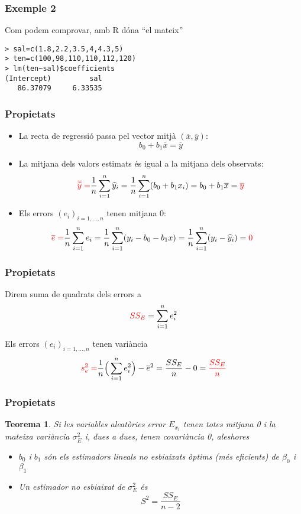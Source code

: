 \documentclass[12pt,t]{beamer}
\newcommand{\red}[1]{\textcolor{red}{#1}}
\renewcommand{\emph}[1]{{\color{red}#1}}
\theoremstyle{plain}
\newtheorem{teorema}{Teorema}
\theoremstyle{definition}
\begin{document}
\begin{frame}[fragile]
\frametitle{Exemple 2}
Com podem comprovar, amb R dóna ``el mateix''
\begin{verbatim}
> sal=c(1.8,2.2,3.5,4,4.3,5)
> ten=c(100,98,110,110,112,120)
> lm(ten~sal)$coefficients
(Intercept)         sal 
   86.37079     6.33535 
\end{verbatim}
\end{frame}



\begin{frame}
\frametitle{Propietats}

\begin{itemize}
\item La recta de regressió passa pel vector mitjà
$(\overline{x},\overline{y})$:
$$
b_0+b_1 \overline{x}=\overline{y}
$$

\item La mitjana dels valors estimats és igual a la mitjana dels
observats:
$$
\red{\overline{\widehat{y}}=}\frac{1}{n}\sum_{i=1}^n\widehat{y}_i
=\frac{1}{n}\sum_{i=1}^n(b_0+b_1x_i)=
b_0+b_1 \overline{x}=\red{\overline{y}}
$$

\item Els errors $(e_i)_{i=1,\ldots,n}$ tenen mitjana 0:
$$
\hspace*{-0.7cm}\red{\overline{e}
=}\frac{1}{n}\sum_{i=1}^n e_i
=\frac{1}{n}\sum_{i=1}^n (y_i-b_0-b_1x)
=\frac{1}{n}\sum_{i=1}^n (y_i-\widehat{y}_i)
=\red{0}
$$
\end{itemize}
\end{frame}



\begin{frame}
\frametitle{Propietats}
Direm \emph{suma de quadrats dels errors} a
$$
\red{SS_E}=\sum_{i=1}^{n} e^2_i
$$
\medskip

Els errors $(e_i)_{i=1,\ldots,n}$ tenen variància
$$
\red{s_e^2=}\frac{1}{n}\Big(\sum_{i=1}^{n}
e^2_i\Big)-\overline{e}^2=\frac{SS_E}{n}-0=\red{\frac{SS_E}{n}}
$$

\end{frame}


\begin{frame}
\frametitle{Propietats}

\begin{teorema}
Si les variables aleatòries error $E_{x_i}$ tenen totes mitjana 0 i la mateixa variància $\sigma^2_E$ i, dues a dues, tenen covariància 0, aleshores

\begin{itemize}
\item $b_0$ i $b_1$ són els estimadors lineals no esbiaixats òptims (més eficients) de $\beta_0$ i $\beta_1$
\medskip

\item Un estimador no esbiaixat de $\sigma_E^2$ és
$$
S^2=\frac{SS_E}{n-2}
$$
\end{itemize}
\end{teorema}
\end{frame}
\end{document}

